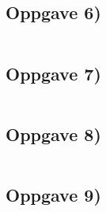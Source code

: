 \documentclass[12p,a4paper]{report}
\begin{document}
\pagebreak
\subsection*{Oppgave 6)}
\inputminted[frame=single, fontsize=\footnotesize]{python}{../src/oppgave5.py}

\pagebreak
\subsection*{Oppgave 7)}
\inputminted[frame=single, fontsize=\footnotesize]{python}{../src/oppgave5.py}

\pagebreak
\subsection*{Oppgave 8)}
\inputminted[frame=single, fontsize=\footnotesize]{python}{../src/oppgave5.py}

\pagebreak
\subsection*{Oppgave 9)}
\inputminted[frame=single, fontsize=\footnotesize]{python}{../src/oppgave5.py}
\end{document}
